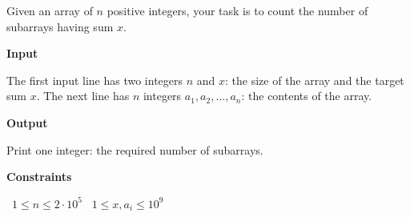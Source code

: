 Given an array of $n$ positive integers, your task is to count the number of subarrays having sum $x$.

\vspace{0.3cm}\noindent\textbf{Input}

The first input line has two integers $n$ and $x$: the size of the array and the target sum $x$.
The next line has $n$ integers $a_1,a_2,\dots,a_n$: the contents of the array.

\vspace{0.3cm}\noindent\textbf{Output}

Print one integer: the required number of subarrays.

\vspace{0.3cm}\noindent\textbf{Constraints}

\textbullet\ $1 \le n \le 2 \cdot 10^5$
\textbullet\ $1 \le x,a_i \le 10^9$